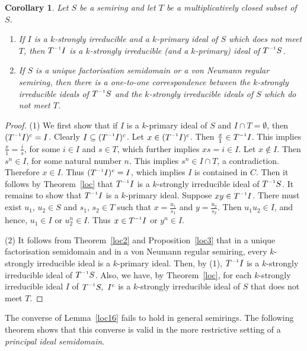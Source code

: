 \documentclass[11pt,english]{amsart}
\newcommand{\inv}{^{\raisebox{.2ex}{$\scriptscriptstyle-1$}}}
\newtheorem{corollary}[theorem]{Corollary}
\theoremstyle{definition}
\numberwithin{equation}{section}
\begin{document}
\begin{corollary}\label{loc4} %
Let $S$  be a semiring and let $T$ be a multiplicatively closed subset of $S$.

\begin{enumerate}
\item If $I$ is a $k$-strongly irreducible and a $k$-primary ideal of $S$ which does not meet $T$,
then $T\inv I$ is a $k$-strongly irreducible (and a $k$-primary) ideal of $T\inv S$.

\item If $S$ is a unique factorisation semidomain or a von Neumann regular semiring, then there is a one-to-one correspondence between the $k$-strongly irreducible ideals of $T\inv S$ and the
$k$-strongly irreducible ideals of $S$ which do not meet $T$.
\end{enumerate}
\end{corollary}

\begin{proof}
(1) We first show that if $I$ is a $k$-primary ideal of $S$ and $I\cap T=\emptyset$, then $(T\inv I)^c=I$. Clearly $I\subseteq (T\inv I)^c$. Let $x\in (T\inv I)^c$. Then $\frac{x}{1}\in T\inv I$. This implies $\frac{x}{1}=\frac{i}{s}$, for some $i\in I$ and $s\in T$, which further implies $xs=i\in I$. Let $x\notin I$. Then $s^n\in I$, for some natural number $n$. This implies $s^n\in I\cap T$, a contradiction. Therefore $x\in I$. Thus $(T\inv I)^c=I$, which implies $I$ is contained in $C$. Then it follows by Theorem~\ref{loc} that $T\inv I$ is a $k$-strongly irreducible ideal of $T\inv S$. It remains to show that $T\inv I$ is a $k$-primary ideal. Suppose $xy \in T\inv I$. There must exist $u_1$, $u_2 \in S$ and $s_1$, $s_2 \in T$ such that $x=\frac{u_1}{s_1} $ and $y=\frac{u_2}{s_2}$. Then $u_1 u_2 \in I$, and hence,  $u_1 \in I$ or $u_2^n \in I$. Thus $x\in T\inv I$ or $y^n \in I$.
    
(2) It follows from Theorem~\ref{loc2} and Proposition~\ref{loc3} that in a unique factorisation semidomain and in a von Neumann regular semiring, every $k$-strongly irreducible ideal is a $k$-primary ideal. Then, by (1), $T\inv I$ is a $k$-strongly irreducible ideal of $T\inv S$. Also, we have, by Theorem~\ref{loc}, for each $k$-strongly irreducible ideal $I$ of $T\inv S,\ I^c$ is a $k$-strongly irreducible ideal of $S$ that does not meet $T$.
\end{proof}

The converse of Lemma~\ref{loc16} fails to hold in general semirings. The following theorem shows that this converse is valid in the more restrictive setting of a \emph{principal ideal semidomain}.
\end{document}
